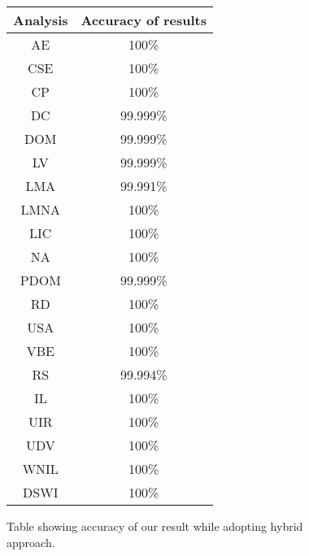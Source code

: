 
\begin{figure}[t]
\begin{footnotesize}
\begin{tabular}{ | c | c |}
\hline
\textbf{Analysis} & \textbf{Accuracy of results} \\ \hline
AE	& 100\% \\ \hline
CSE	& 100\% \\ \hline
CP	& 100\% \\ \hline
DC	& 99.999\% \\ \hline
DOM	& 99.999\% \\ \hline
LV	& 99.999\% \\ \hline
LMA	& 99.991\% \\ \hline
LMNA	& 100\% \\ \hline
LIC	& 100\% \\ \hline
NA	& 100\% \\ \hline
PDOM	& 99.999\% \\ \hline
RD	& 100\% \\ \hline
USA	& 100\% \\ \hline
VBE	& 100\% \\ \hline
RS	& 99.994\% \\ \hline
IL	& 100\% \\ \hline
UIR	& 100\% \\ \hline
UDV	& 100\% \\ \hline
WNIL	& 100\% \\ \hline
DSWI	& 100\% \\ \hline
\end{tabular}
\end{footnotesize}
\caption{Table showing accuracy of our result while adopting hybrid approach.}
\end{figure}
